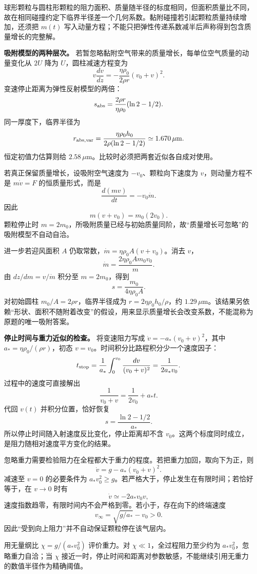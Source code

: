 \documentclass[12pt,a4paper,UTF8]{ctexart}
\begin{document}
球形颗粒与圆柱形颗粒的阻力面积、质量随半径的标度相同，但面积质量比不同，故在相同碰撞约定下临界半径差一个几何系数。黏附碰撞若引起颗粒质量持续增加，还须把
\(m(t)\)
写入动量方程；不能只把弹性传递系数减半后声称得到包含质量增长的完整解。

\textbf{吸附模型的两种层次。}
若暂忽略黏附空气带来的质量增长，每单位空气质量的动量变化从 \(2U\) 降为
\(U\)，圆柱减速方程变为 \[
v\frac{dv}{dz}=-\frac{\eta\rho_0}{2\rho r}(v_0+v)^2.
\] 变速停止距离为弹性反射模型的两倍： \[
s_{\rm abs}=\frac{2\rho r}{\eta\rho_0}(\ln2-1/2).
\] 同一厚度下，临界半径为 \[
r_{\rm abs,var}=\frac{\eta\rho_0h_0}{2\rho(\ln2-1/2)}\simeq1.670\,\mu\mathrm m.
\] 恒定初值力估算则给
\(2.58\,\mu\mathrm m\)。比较时必须把两套近似各自成对使用。

若真正保留质量增长，设吸附空气速度为 \(-v_0\)、颗粒向下速度为
\(v\)，则动量方程不是 \(m\dot v=F\) 的恒质量形式，而是 \[
\frac{d(mv)}{dt}=-v_0\dot m.
\] 因此 \[
m(v+v_0)=m_0(2v_0).
\] 颗粒停止时
\(m=2m_0\)，所吸附质量已经与初始质量同阶，故``质量增长可忽略''的吸附模型不自动自洽。

进一步若迎风面积 \(A\) 仍取常数，\(\dot m=\eta\rho_0A(v+v_0)\)。消去
\(v\)， \[
\dot m=\frac{2\eta\rho_0Am_0v_0}{m}.
\] 由 \(dz/dm=v/\dot m\) 积分至 \(m=2m_0\)，得到 \[
s=\frac{m_0}{4\eta\rho_0A}.
\] 对初始圆柱 \(m_0/A=2\rho r\)，临界半径成为
\(r=2\eta\rho_0h_0/\rho\)，约
\(1.29\,\mu\mathrm m\)。该结果另依赖``形状、面积不随附着改变''的假设，用来显示质量增长会改变系数，不能混称为原题的唯一吸附答案。

\textbf{停止时间与重力近似的检查。} 将变速阻力写成
\(\dot v=-a_*(v_0+v)^2\)，其中 \(a_*=\eta\rho_0/(\rho r)\)，初态
\(v=v_0\)。时间积分比路程积分少一个速度因子： \[
t_{\rm stop}=\frac1{a_*}\int_0^{v_0}\frac{dv}{(v_0+v)^2}
=\frac1{2a_*v_0}.
\] 过程中的速度可直接解出 \[
\frac1{v_0+v}=\frac1{2v_0}+a_*t.
\] 代回 \(v(t)\) 并积分位置，恰好恢复 \[
s=\frac{\ln2-1/2}{a_*}.
\] 所以停止时间随入射速度反比变化，停止距离却不含
\(v_0\)。这两个标度同时成立，是阻力随相对速度平方变化的结果。

忽略重力需要检验阻力在全程都大于重力的程度。若把重力加回，取向下为正，则
\[
\dot v=g-a_*(v_0+v)^2.
\] 减速至 \(v=0\) 的必要条件为
\(a_*v_0^2\ge g\)。若严格大于，停止发生在有限时间；若恰好等于，在
\(v\to0\) 时有 \[
\dot v\simeq-2a_*v_0v,
\] 速度指数趋零，有限时间内不会严格到零。若小于，存在向下的终端速度 \[
v_\infty=\sqrt{g/a_*}-v_0>0.
\] 因此``受到向上阻力''并不自动保证颗粒停在该气层内。

用无量纲比 \(\chi=g/(a_*v_0^2)\) 评价重力。对
\(\chi\ll1\)，全过程阻力至少约为 \(a_*v_0^2\)，忽略重力自洽；当 \(\chi\)
接近一时，停止时间和距离对参数敏感，不能继续引用无重力的数值半径作为精确阈值。
\end{document}
